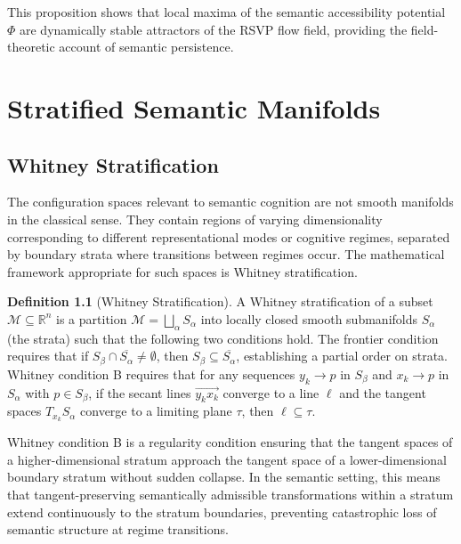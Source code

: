 \documentclass[12pt, a4paper, openany]{book}
\theoremstyle{plain}
\theoremstyle{definition}
\newtheorem{definition}[theorem]{Definition}
\theoremstyle{remark}
\begin{document}
This proposition shows that local maxima of the semantic accessibility potential $\Phi$ are dynamically stable attractors of the RSVP flow field, providing the field-theoretic account of semantic persistence.

\chapter{Stratified Semantic Manifolds}

\section{Whitney Stratification}

The configuration spaces relevant to semantic cognition are not smooth manifolds in the classical sense. They contain regions of varying dimensionality corresponding to different representational modes or cognitive regimes, separated by boundary strata where transitions between regimes occur. The mathematical framework appropriate for such spaces is Whitney stratification.

\begin{definition}[Whitney Stratification]
A Whitney stratification of a subset $\mathcal{M} \subseteq \mathbb{R}^n$ is a partition $\mathcal{M} = \bigsqcup_\alpha S_\alpha$ into locally closed smooth submanifolds $S_\alpha$ (the strata) such that the following two conditions hold. The frontier condition requires that if $S_\beta \cap \overline{S_\alpha} \neq \emptyset$, then $S_\beta \subseteq \overline{S_\alpha}$, establishing a partial order on strata. Whitney condition B requires that for any sequences $y_k \to p$ in $S_\beta$ and $x_k \to p$ in $S_\alpha$ with $p \in S_\beta$, if the secant lines $\overrightarrow{y_k x_k}$ converge to a line $\ell$ and the tangent spaces $T_{x_k} S_\alpha$ converge to a limiting plane $\tau$, then $\ell \subseteq \tau$.
\end{definition}

Whitney condition B is a regularity condition ensuring that the tangent spaces of a higher-dimensional stratum approach the tangent space of a lower-dimensional boundary stratum without sudden collapse. In the semantic setting, this means that tangent-preserving semantically admissible transformations within a stratum extend continuously to the stratum boundaries, preventing catastrophic loss of semantic structure at regime transitions.
\end{document}
